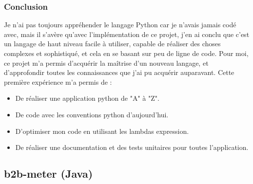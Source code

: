 \subsubsection{Conclusion}
Je n'ai pas toujours appréhender le langage Python car je n'avais jamais codé avec, mais il s'avère qu'avec l'implémentation de ce projet, j'en ai conclu que c'est un langage de haut niveau facile à utiliser, capable de réaliser des choses complexes et sophistiqué, et cela en se basant sur peu de ligne de code.
Pour moi, ce projet m'a permis d'acquérir la maîtrise d'un nouveau langage, et d'approfondir toutes les connaissances que j'ai pu acquérir auparavant. Cette première expérience m'a permis de :
\begin{itemize}
	\item De réaliser une application python de "A" à "Z".
	\item De code avec les conventions python d’aujourd’hui.
	\item D'optimiser mon code en utilisant les lambdas expression.
	\item De réaliser une documentation et des tests unitaires pour toutes l'application. 
\end{itemize}
\subsection{b2b-meter (Java)}
